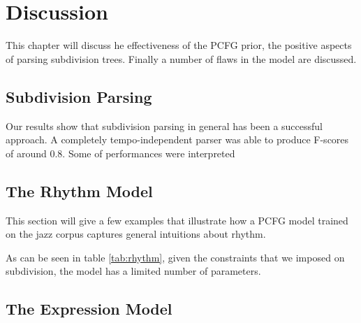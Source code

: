 \chapter{Discussion}
\label{sec:discussion}



This chapter will discuss he effectiveness of the PCFG prior, the positive aspects of parsing subdivision trees. Finally a number of flaws in the model are discussed.

\section{Subdivision Parsing}

Our results show that subdivision parsing in general has been a successful approach. A completely tempo-independent parser was able to produce F-scores of around 0.8. Some of performances were interpreted 

\section{The Rhythm Model}

This section will give a few examples that illustrate how a PCFG model trained on the jazz corpus captures general intuitions about rhythm.

As can be seen in table \ref{tab:rhythm}, given the constraints that we imposed on subdivision, the model has a limited number of parameters. %

\section{The Expression Model}


